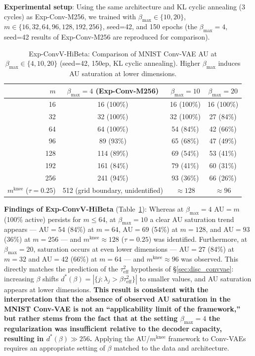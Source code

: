 \documentclass[make,article,submit,pdftex,moreauthors]{Definitions/mdpi}
\newcommand{\mknee}{m^{\mathrm{knee}}}
\begin{document}
\textbf{Experimental setup}: Using the same architecture and KL cyclic annealing (3 cycles) as Exp-Conv-M256,
we trained with $\beta_{\max} \in \{10, 20\}$, $m \in \{16, 32, 64, 96, 128, 192, 256\}$,
seed=42, and 150 epochs (the $\beta_{\max}=4$, seed=42 results of Exp-Conv-M256 are reproduced for comparison).

\begin{table}[H]
\centering
\caption{Exp-ConvV-HiBeta: Comparison of MNIST Conv-VAE AU at $\beta_\mathrm{max} \in \{4, 10, 20\}$ (seed=42, 150ep, KL cyclic annealing). Higher $\beta_\mathrm{max}$ induces AU saturation at lower dimensions.}
\label{tab:hibeta}
\small
\begin{tabular}{r ccc}
\toprule
$m$ & $\beta_{\max}=4$ (Exp-Conv-M256) & $\beta_{\max}=10$ & $\beta_{\max}=20$ \\
\midrule
 16  & 16  (100\%)& 16 (100\%) & 16 (100\%) \\
 32  & 32  (100\%)& 32 (100\%) & 27 (84\%)  \\
 64  & 64  (100\%)& 54 (84\%)  & 42 (66\%)  \\
 96  & 89  (93\%) & 65 (68\%)  & 47 (49\%)  \\
128  & 114 (89\%) & 69 (54\%)  & 53 (41\%)  \\
192  & 161 (84\%) & 79 (41\%)  & 60 (31\%)  \\
256  & 241 (94\%) & 93 (36\%)  & 66 (26\%)  \\
\midrule
$\mknee$ ($\tau=0.25$) & 512 (grid boundary, unidentified) & $\approx 128$ & $\approx 96$ \\
\bottomrule
\end{tabular}
\end{table}

\textbf{Findings of Exp-ConvV-HiBeta} (Table~\ref{tab:hibeta}):
Whereas at $\beta_{\max}=4$ AU$=m$ (100\% active) persists for $m \leq 64$,
at $\beta_{\max}=10$ a clear AU saturation trend appears --- AU$=54$ (84\%) at $m=64$,
AU$=69$ (54\%) at $m=128$, and AU$=93$ (36\%) at $m=256$ ---
and $\mknee \approx 128$ ($\tau=0.25$) was identified.
Furthermore, at $\beta_{\max}=20$, saturation occurs at even lower dimensions ---
AU$=27$ (84\%) at $m=32$ and AU$=42$ (66\%) at $m=64$ --- and $\mknee \approx 96$ was observed.
This directly matches the prediction of the $\tau^2_\mathrm{eff}$ hypothesis of \S\ref{sec:disc_convvae}:
increasing $\beta$ shifts $d^*(\beta) = |\{j: \lambda_j > \beta\tau^2_\mathrm{eff}\}|$ to smaller values,
and AU saturation appears at lower dimensions.
\textbf{This result is consistent with the interpretation that the absence of observed AU saturation
in the MNIST Conv-VAE is not an ``applicability limit of the framework,'' but rather stems from the fact
that at the setting $\beta_{\max}=4$ the regularization was insufficient relative to the decoder capacity,
resulting in $d^*(\beta) \gg 256$.}
Applying the AU/$\mknee$ framework to Conv-VAEs requires an appropriate setting of $\beta$
matched to the data and architecture.
\end{document}
